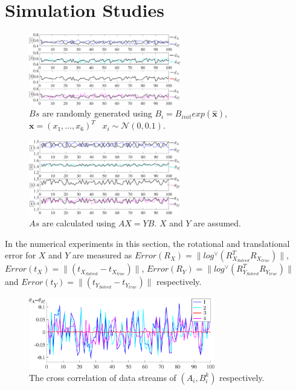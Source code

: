 \documentclass[letterpaper, 10 pt, conference]{ieeeconf}  %
\begin{document}
\section{Simulation Studies}
\label{sect4}

\begin{center}
\begin{figure}
\centering
\includegraphics[width=2.6in]{fig3.eps}
\caption{
$Bs$ are randomly generated using  $B_i=B_{init}exp(\widehat{\mathbf{x}})$,$\mathbf{x}=(x_1,\dots,x_6)^T $ \ $x_i \sim \mathcal{N}(0,0.1)$.
}
\label{fig2}
\end{figure}
\end{center}

\begin{figure}
\centering
\includegraphics[width=2.6in,bb=84 202 501 581]{fig2.eps}
\caption{
$As$ are calculated using $AX=YB$. $X$ and $Y$ are assumed.
}
\label{fig3}
\end{figure}


In the numerical experiments in this section, the rotational and translational error for $X$ and $Y$ are measured as  $Error(R_X) = \parallel log^{\vee} (R_{X_{Solved}}^{T}R_{X_{true}})\parallel$, $Error(t_X) = \parallel (t_{X_{Solved}}-t_{X_{true}})\parallel$, $Error(R_Y) = \parallel log^{\vee} (R_{Y_{Solved}}^{T}R_{Y_{true}})\parallel$ and $Error(t_Y) = \parallel (t_{Y_{Solved}}-t_{Y_{true}})\parallel$ respectively.

\begin{center}
\begin{figure}
\centering
\includegraphics[width=3.2in]{fig4.eps}
\caption{
The cross correlation of data streams of $(A_{i},B_{i}^{k})$ respectively.
}
\label{fig4}
\end{figure}
\end{center}
\end{document}
